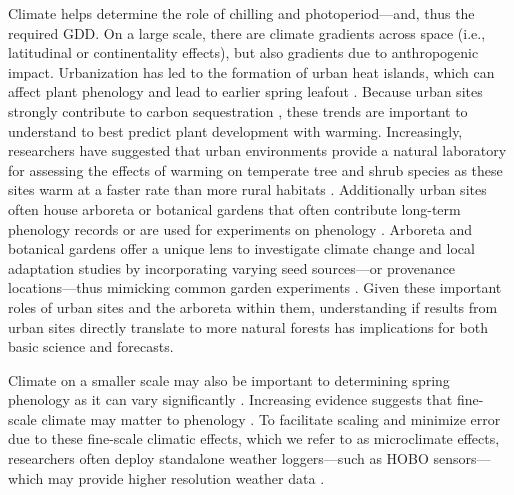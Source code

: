 \documentclass{article}\usepackage[]{graphicx}\usepackage[]{color}
\begin{document}
Climate helps determine the role of chilling and photoperiod---and, thus the required GDD. On a large scale, there are climate gradients across space (i.e., latitudinal or continentality effects), but also gradients due to anthropogenic impact. Urbanization has led to the formation of urban heat islands, which can affect plant phenology and lead to earlier spring leafout \citep{Meng2020}. Because urban sites strongly contribute to carbon sequestration \citep{Ziter2018}, these trends are important to understand to best predict plant development with warming. Increasingly, researchers have suggested that urban environments provide a natural laboratory for assessing the effects of warming on temperate tree and shrub species as these sites warm at a faster rate than more rural habitats \citep{Grimm2008,Pickett2011}. Additionally urban sites often house arboreta or botanical gardens that often contribute long-term phenology records \citep{Zohner2014} or are used for experiments on phenology \citep{Ettinger2018}. Arboreta and botanical gardens offer a unique lens to investigate climate change and local adaptation studies by incorporating varying seed sources---or provenance locations---thus mimicking common garden experiments \citep{Primack2009}. Given these important roles of urban sites and the arboreta within them, understanding if results from urban sites directly translate to more natural forests has implications for both basic science and forecasts.  
  
Climate on a smaller scale may also be important to determining spring phenology as it can vary significantly \citep[e.g., as much as 2.6$^{\circ}$C between sensors at the same vineyard or up to 6.6$^{\circ}$C within 1 km spatial units in northern Europe,][]{Lenoir2013,deResseguier2020}. Increasing evidence suggests that fine-scale climate may matter to phenology \citep{Lembrechts2019}. To facilitate scaling and minimize error due to these fine-scale climatic effects, which we refer to as microclimate effects, researchers often deploy standalone weather loggers---such as HOBO sensors---which may provide higher resolution weather data \citep{Schwartz2013a,Whiteman2000}.  
 
\end{document}
